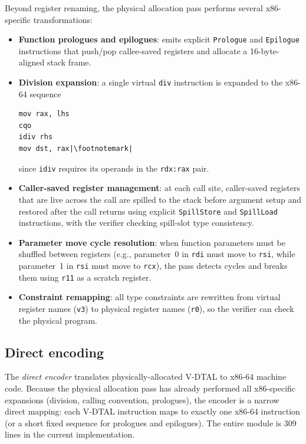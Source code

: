 Beyond register renaming, the physical allocation pass performs several x86-specific transformations:

\begin{itemize}
  \item \textbf{Function prologues and epilogues}: emits explicit \texttt{Prologue} and \texttt{Epilogue} instructions that push/pop callee-saved registers and allocate a 16-byte-aligned stack frame.
  \item \textbf{Division expansion}: a single virtual \texttt{div} instruction is expanded to the x86-64 sequence 
\begin{center}
\begin{minipage}{0.35\textwidth}
\centering
\begin{verbatim}
mov rax, lhs
cqo
idiv rhs
mov dst, rax|\footnotemark|
\end{verbatim}
\end{minipage}
\end{center}
since \texttt{idiv} requires its operands in the \texttt{rdx:rax} pair.
  \item \textbf{Caller-saved register management}: at each call site, caller-saved registers that are live across the call are spilled to the stack before argument setup and restored after the call returns using explicit \texttt{SpillStore} and \texttt{SpillLoad} instructions, with the verifier checking spill-slot type consistency.
  \item \textbf{Parameter move cycle resolution}: when function parameters must be shuffled between registers (e.g., parameter~0 in \texttt{rdi} must move to \texttt{rsi}, while parameter~1 in \texttt{rsi} must move to \texttt{rcx}), the pass detects cycles and breaks them using \texttt{r11} as a scratch register.
  \item \textbf{Constraint remapping}: all type constraints are rewritten from virtual register names (\texttt{v3}) to physical register names (\texttt{r0}), so the verifier can check the physical program.
\end{itemize}

\subsection{Direct encoding}\label{sec:direct-encoding}

The \textit{direct encoder} translates physically-allocated V-DTAL to x86-64 machine code. Because the physical allocation pass has already performed all x86-specific expansions (division, calling convention, prologues), the encoder is a narrow direct mapping: each V-DTAL instruction maps to exactly one x86-64 instruction (or a short fixed sequence for prologues and epilogues). The entire module is 309 lines in the current implementation.


